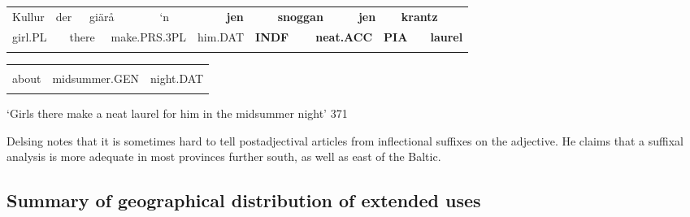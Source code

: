 \begin{tabular}{llllllllllllllll}
\lsptoprule
Kullur & \multicolumn{2}{l}{der

} & \multicolumn{2}{l}{giärå

} & \multicolumn{2}{l}{‘n

} & \multicolumn{2}{l}{{\bfseries jen}

} & \multicolumn{2}{l}{{\bfseries snoggan}

} & \multicolumn{2}{l}{{\bfseries jen}

} & \multicolumn{2}{l}{{\bfseries krantz}

} & \\
\multicolumn{2}{l}{girl.PL

} & \multicolumn{2}{l}{there

} & \multicolumn{2}{l}{make.PRS.3PL

} & \multicolumn{2}{l}{him.DAT

} & \multicolumn{2}{l}{{\bfseries INDF}

} & \multicolumn{2}{l}{{\bfseries neat.ACC}

} & \multicolumn{2}{l}{{\bfseries PIA}

} & \multicolumn{2}{l}{{\bfseries laurel}

}\\
\lspbottomrule
\end{tabular}

\begin{tabular}{lll}
\lsptoprule
\multicolumn{3}{l}{um

}\\
about & midsummer.GEN & night.DAT\\
\lspbottomrule
\end{tabular}

\begin{styleTranslation}
‘Girls there make a neat laurel for him in the midsummer night’ 371

\end{styleTranslation}

\begin{styleBodyTextFirst}
Delsing notes that it is sometimes hard to tell postadjectival articles from inflectional suffixes on the adjective. He claims that a suffixal analysis is more adequate in most provinces further south, as well as east of the Baltic. 

\end{styleBodyTextFirst}

\subsection{\rmfamily Summary of geographical distribution of extended uses}

